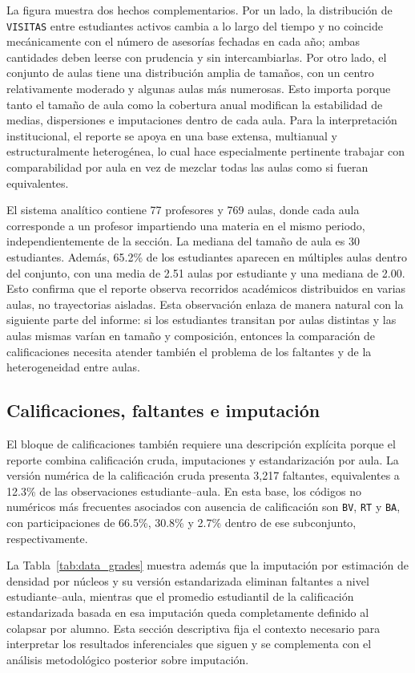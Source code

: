 \documentclass[10pt,letterpaper]{article} %
\numberwithin{figure}{subsection}
\begin{document}
La figura muestra dos hechos complementarios. Por un lado, la distribución de \texttt{VISITAS} entre estudiantes activos cambia a lo largo del tiempo y no coincide mecánicamente con el número de asesorías fechadas en cada año; ambas cantidades deben leerse con prudencia y sin intercambiarlas. Por otro lado, el conjunto de aulas tiene una distribución amplia de tamaños, con un centro relativamente moderado y algunas aulas más numerosas. Esto importa porque tanto el tamaño de aula como la cobertura anual modifican la estabilidad de medias, dispersiones e imputaciones dentro de cada aula. Para la interpretación institucional, el reporte se apoya en una base extensa, multianual y estructuralmente heterogénea, lo cual hace especialmente pertinente trabajar con comparabilidad por aula en vez de mezclar todas las aulas como si fueran equivalentes.

El sistema analítico contiene 77 profesores y 769 aulas, donde cada aula corresponde a un profesor impartiendo una materia en el mismo periodo, independientemente de la sección. La mediana del tamaño de aula es 30 estudiantes. Además, 65.2\% de los estudiantes aparecen en múltiples aulas dentro del conjunto, con una media de 2.51 aulas por estudiante y una mediana de 2.00. Esto confirma que el reporte observa recorridos académicos distribuidos en varias aulas, no trayectorias aisladas. Esta observación enlaza de manera natural con la siguiente parte del informe: si los estudiantes transitan por aulas distintas y las aulas mismas varían en tamaño y composición, entonces la comparación de calificaciones necesita atender también el problema de los faltantes y de la heterogeneidad entre aulas.

\subsection{Calificaciones, faltantes e imputación}
El bloque de calificaciones también requiere una descripción explícita porque el reporte combina calificación cruda, imputaciones y estandarización por aula. La versión numérica de la calificación cruda presenta 3{,}217 faltantes, equivalentes a 12.3\% de las observaciones estudiante--aula. En esta base, los códigos no numéricos más frecuentes asociados con ausencia de calificación son \texttt{BV}, \texttt{RT} y \texttt{BA}, con participaciones de 66.5\%, 30.8\% y 2.7\% dentro de ese subconjunto, respectivamente.

La Tabla~\ref{tab:data_grades} muestra además que la imputación por estimación de densidad por núcleos y su versión estandarizada eliminan faltantes a nivel estudiante--aula, mientras que el promedio estudiantil de la calificación estandarizada basada en esa imputación queda completamente definido al colapsar por alumno. Esta sección descriptiva fija el contexto necesario para interpretar los resultados inferenciales que siguen y se complementa con el análisis metodológico posterior sobre imputación.
\end{document}
